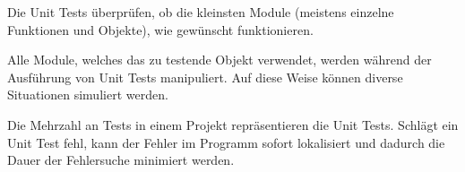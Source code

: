 
Die Unit Tests überprüfen, ob die kleinsten Module (meistens einzelne Funktionen und Objekte), 
wie gewünscht funktionieren. 

Alle Module, welches das zu testende Objekt verwendet, werden während der Ausführung von Unit Tests manipuliert.
Auf diese Weise können diverse Situationen simuliert werden.

Die Mehrzahl an Tests in einem Projekt repräsentieren die Unit Tests. Schlägt ein Unit Test fehl, 
kann der Fehler im Programm sofort lokalisiert und dadurch die Dauer der Fehlersuche minimiert werden.
